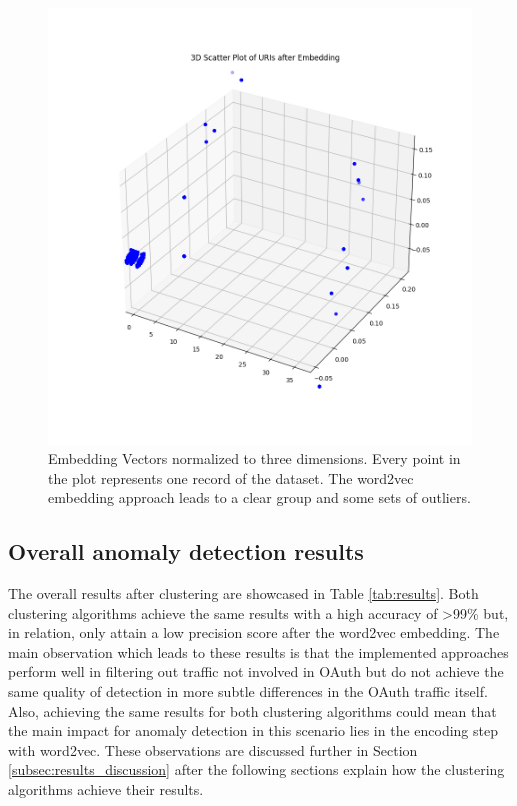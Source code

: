 \begin{figure}[H]
	\sffamily\footnotesize
	\includegraphics[width=1\textwidth]{pic/word_embeddings_3d.png}
	\unitlength=0.75mm
	\linethickness{0.4pt}
	\caption{Embedding Vectors normalized to three dimensions. Every point in the plot represents one record of the dataset. The word2vec embedding approach leads to a clear group and some sets of outliers.}
	\label{fig:word_embeddings3D}
\end{figure}

\subsection{Overall anomaly detection results}
The overall results after clustering are showcased in Table \ref{tab:results}. Both clustering algorithms achieve the same results with a high accuracy of >99\% but, in relation, only attain a low precision score after the word2vec embedding. The main observation which leads to these results is that the implemented approaches perform well in filtering out traffic not involved in OAuth but do not achieve the same quality of detection in more subtle differences in the OAuth traffic itself. Also, achieving the same results for both clustering algorithms could mean that the main impact for anomaly detection in this scenario lies in the encoding step with word2vec. These observations are discussed further in Section \ref{subsec:results_discussion} after the following sections explain how the clustering algorithms achieve their results.

